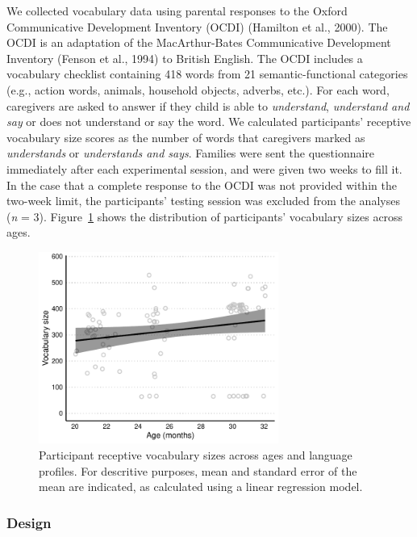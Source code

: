 \documentclass[
  12pt,
  b5paperpaper,
  twoside]{scrreprt}
\begin{document}
We collected vocabulary data using parental responses to the Oxford
Communicative Development Inventory (OCDI) (Hamilton et al., 2000). The
OCDI is an adaptation of the MacArthur-Bates Communicative Development
Inventory (Fenson et al., 1994) to British English. The OCDI includes a
vocabulary checklist containing 418 words from 21 semantic-functional
categories (e.g., action words, animals, household objects, adverbs,
etc.). For each word, caregivers are asked to answer if they child is
able to \emph{understand}, \emph{understand and say} or does not
understand or say the word. We calculated participants' receptive
vocabulary size scores as the number of words that caregivers marked as
\emph{understands} or \emph{understands and says}. Families were sent
the questionnaire immediately after each experimental session, and were
given two weeks to fill it. In the case that a complete response to the
OCDI was not provided within the two-week limit, the participants'
testing session was excluded from the analyses (\emph{n} = 3).
Figure~\ref{fig-vocabulary-oxf} shows the distribution of participants'
vocabulary sizes across ages.

\begin{figure}

{\centering \includegraphics[width=0.7\textwidth,height=\textheight]{chapters/03-chapter-3_files/figure-pdf/fig-vocabulary-oxf-1.pdf}

}

\caption{\label{fig-vocabulary-oxf}Participant receptive vocabulary
sizes across ages and language profiles. For descritive purposes, mean
and standard error of the mean are indicated, as calculated using a
linear regression model.}

\end{figure}

\hypertarget{design}{%
\subsubsection{Design}\label{design}}
\end{document}
